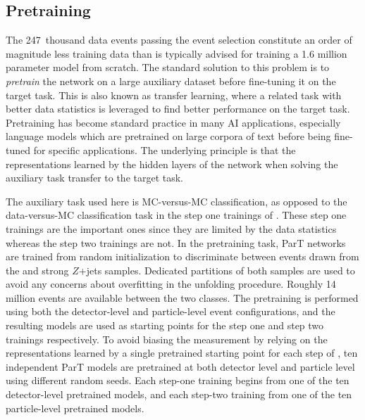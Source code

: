 \FloatBarrier

\subsection{Pretraining}
\label{sec:zjets-pretraining}

The 247~thousand data events passing the event selection constitute an order of magnitude less training data than is typically advised for training a 1.6 million parameter model from scratch.
The standard solution to this problem is to \textit{pretrain} the network on a large auxiliary dataset before fine-tuning it on the target task.
This is also known as transfer learning, where a related task with better data statistics is leveraged to find better performance on the target task.
Pretraining has become standard practice in many AI applications, especially language models which are pretrained on large corpora of text before being fine-tuned for specific applications.
The underlying principle is that the representations learned by the hidden layers of the network when solving the auxiliary task transfer to the target task.

The auxiliary task used here is MC-versus-MC classification, as opposed to the data-versus-MC classification task in the step one trainings of \Omnifold.
These step one trainings are the important ones since they are limited by the data statistics whereas the step two trainings are not.
In the pretraining task, ParT networks are trained from random initialization to discriminate between events drawn from the \mgpy and \sherpa strong $Z$+jets samples.
Dedicated partitions of both samples are used to avoid any concerns about overfitting in the unfolding procedure.
Roughly 14 million events are available between the two classes.
The pretraining is performed using both the detector-level and particle-level event configurations, and the resulting models are used as starting points for the step one and step two trainings respectively.
To avoid biasing the measurement by relying on the representations learned by a single pretrained starting point for each step of \Omnifold, ten independent ParT models are pretrained at both detector level and particle level using different random seeds.
Each \Omnifold step-one training begins from one of the ten detector-level pretrained models, and each step-two training from one of the ten particle-level pretrained models.

